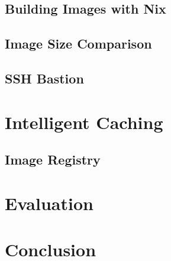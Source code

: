 \section{Building Images with Nix}

\section{Image Size Comparison}

\section{SSH Bastion}

\chapter{Intelligent Caching}

\section{Image Registry}

\chapter{Evaluation}

\chapter{Conclusion}

\cleardoublepage
{}
{}
\printbibliography






